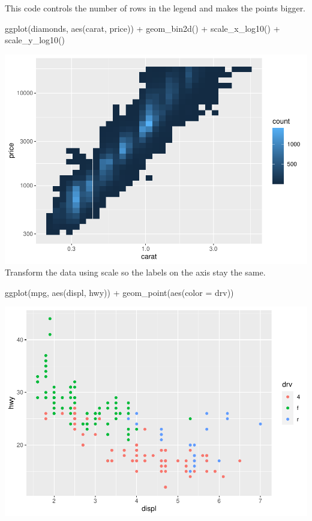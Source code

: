 \documentclass[
]{article}
\newenvironment{Shaded}{\begin{snugshade}}{\end{snugshade}}
\newcommand{\AttributeTok}[1]{\textcolor[rgb]{0.77,0.63,0.00}{#1}}
\newcommand{\FunctionTok}[1]{\textcolor[rgb]{0.00,0.00,0.00}{#1}}
\newcommand{\NormalTok}[1]{#1}
\newcommand{\SpecialCharTok}[1]{\textcolor[rgb]{0.00,0.00,0.00}{#1}}
\begin{document}
This code controls the number of rows in the legend and makes the points
bigger.

\begin{Shaded}
\begin{Highlighting}[]
\FunctionTok{ggplot}\NormalTok{(diamonds, }\FunctionTok{aes}\NormalTok{(carat, price)) }\SpecialCharTok{+}
  \FunctionTok{geom\_bin2d}\NormalTok{() }\SpecialCharTok{+} 
  \FunctionTok{scale\_x\_log10}\NormalTok{() }\SpecialCharTok{+} 
  \FunctionTok{scale\_y\_log10}\NormalTok{()}
\end{Highlighting}
\end{Shaded}

\includegraphics{Assignments_files/figure-latex/unnamed-chunk-66-1.pdf}
Transform the data using scale so the labels on the axis stay the same.

\begin{Shaded}
\begin{Highlighting}[]
\FunctionTok{ggplot}\NormalTok{(mpg, }\FunctionTok{aes}\NormalTok{(displ, hwy)) }\SpecialCharTok{+}
  \FunctionTok{geom\_point}\NormalTok{(}\FunctionTok{aes}\NormalTok{(}\AttributeTok{color =}\NormalTok{ drv))}
\end{Highlighting}
\end{Shaded}

\includegraphics{Assignments_files/figure-latex/unnamed-chunk-67-1.pdf}
\end{document}
